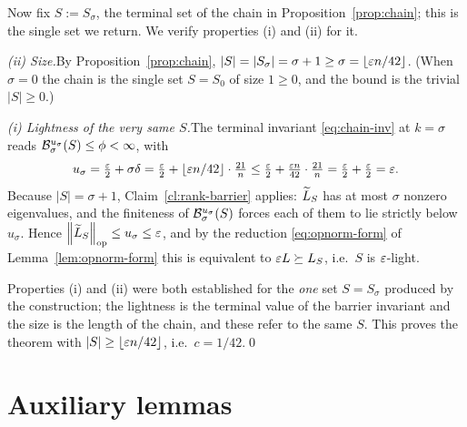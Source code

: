 Now fix $S:=S_\sigma$, the terminal set of the chain in
Proposition~\ref{prop:chain}; this is the single set we return. We verify
properties (i) and (ii) for it.

\medskip\noindent\emph{(ii) Size.}\quad By Proposition~\ref{prop:chain},
$|S|=|S_\sigma|=\sigma+1\ge\sigma=\lfloor\varepsilon n/42\rfloor$. (When $\sigma=0$ the
chain is the single set $S=S_0$ of size $1\ge0$, and the bound is the trivial
$|S|\ge0$.)

\medskip\noindent\emph{(i) Lightness of the very same $S$.}\quad The terminal
invariant \eqref{eq:chain-inv} at $k=\sigma$ reads
$\mathcal{B}^{u_\sigma}_{\sigma}(S)\le\phi<\infty$, with
\[
  u_\sigma=\tfrac{\varepsilon}{2}+\sigma\delta
          =\tfrac{\varepsilon}{2}+\lfloor\varepsilon n/42\rfloor\cdot\tfrac{21}{n}
          \le\tfrac{\varepsilon}{2}+\tfrac{\varepsilon n}{42}\cdot\tfrac{21}{n}
          =\tfrac{\varepsilon}{2}+\tfrac{\varepsilon}{2}=\varepsilon .
\]
Because $|S|=\sigma+1$, Claim~\ref{cl:rank-barrier} applies: $\widetilde{L}_S$ has at most
$\sigma$ nonzero eigenvalues, and the finiteness of
$\mathcal{B}^{u_\sigma}_{\sigma}(S)$ forces each of them to lie strictly below
$u_\sigma$. Hence $\left\lVert \widetilde{L}_S \right\rVert_{\mathrm{op}}\le u_\sigma\le\varepsilon$, and by
the reduction \eqref{eq:opnorm-form} of Lemma~\ref{lem:opnorm-form} this is
equivalent to $\varepsilon L\succeq L_S$, i.e.\ $S$ is $\varepsilon$-light.

\medskip
Properties (i) and (ii) were both established for the \emph{one} set $S=S_\sigma$
produced by the construction; the lightness is the terminal value of the barrier
invariant and the size is the length of the chain, and these refer to the same
$S$. This proves the theorem with $|S|\ge\lfloor\varepsilon n/42\rfloor$, i.e.\
$c=1/42$.\qed

\section*{Auxiliary lemmas}

